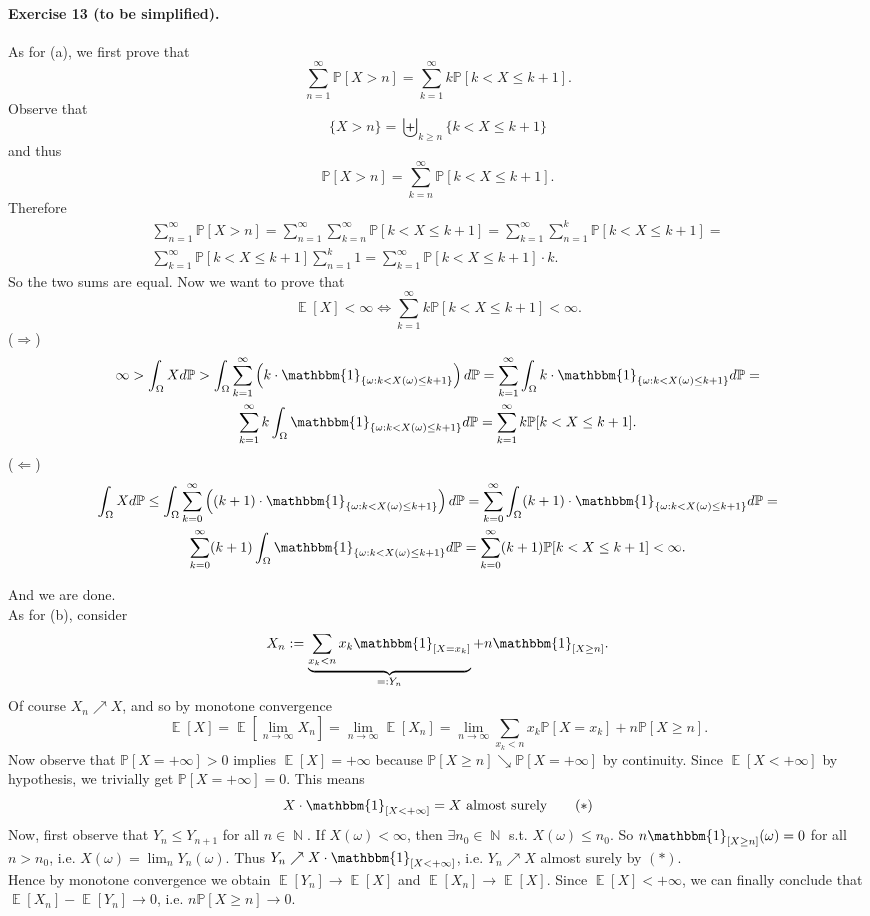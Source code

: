 \documentclass[12pt,a4paper]{report}
\theoremstyle{definition}
\theoremstyle{num.custom-title}
\DeclareMathOperator{\E}{\mathbb{E}}
\DeclareMathOperator{\N}{\mathbb{N}}
\renewcommand{\1}{\mathbbm{1}}
\renewcommand{\P}{\mathbb{P}}
\renewcommand{\iff}{\Leftrightarrow}
\begin{document}
\paragraph{Exercise 13 (to be simplified).}
As for (a), we first prove that
\[
	\sum_{n=1}^\infty \P[X>n] = \sum_{k=1}^\infty k \P[k < X \leq k+1].
\]
Observe that 
\[
\{X>n\}= \biguplus_{k \geq n} \{k < X \leq k+1\}
\]
and thus 
\[
\P[X>n] = \sum_{k=n}^\infty \P[k < X \leq k+1].
\]
Therefore
\begin{multline*}
	\sum_{n=1}^\infty \P[X>n] = \sum_{n=1}^\infty \sum_{k=n}^\infty \P[k < X \leq k+1] = \sum_{k=1}^\infty \sum_{n=1}^k \P[k < X \leq k+1] =\\
	\sum_{k=1}^\infty \P[k < X \leq k+1] \sum_{n=1}^k 1 = \sum_{k=1}^\infty \P[k < X \leq k+1] \cdot k.
\end{multline*}
So the two sums are equal. Now we want to prove that 
\[
\E[X] < \infty \iff \sum_{k=1}^\infty k \P[k < X \leq k+1] < \infty.
\]
($\Longrightarrow$)
\begin{multline*}
	\infty > \int_\Omega X d\P > \int_\Omega \sum_{k=1}^\infty \left( k \cdot \1_{\{\omega : k<X(\omega) \leq k+1\}} \right) d\P= \sum_{k=1}^\infty \int_\Omega k \cdot \1_{\{\omega : k<X(\omega) \leq k+1\}} d\P=\\
	\sum_{k=1}^\infty k \int_\Omega \1_{\{\omega : k<X(\omega) \leq k+1\}} d\P = \sum_{k=1}^\infty k \P[k < X \leq k+1].
\end{multline*}
($\Longleftarrow$)
\begin{multline*}
	\int_\Omega X d\P \leq \int_\Omega \sum_{k=0}^\infty \left( (k+1) \cdot \1_{\{\omega : k<X(\omega) \leq k+1\}} \right) d\P = \sum_{k=0}^\infty \int_\Omega (k+1) \cdot \1_{\{\omega : k<X(\omega) \leq k+1\}} d\P=\\
	\sum_{k=0}^\infty (k+1) \int_\Omega \1_{\{\omega : k<X(\omega) \leq k+1\}} d\P = \sum_{k=0}^\infty (k+1) \P[k < X \leq k+1] < \infty.
\end{multline*}

And we are done.\\
As for (b), consider
\[
X_n := \underbrace{\sum_{x_k < n} x_k \1_{[X=x_k]}}_{=:Y_n} + n \1_{[X \geq n]}.
\]
Of course $X_n \nearrow X$, and so by monotone convergence
\[
\E[X] = \E[\lim_{n \to \infty} X_n] = \lim_{n \to \infty} \E[X_n] = \lim_{n \to \infty} \sum_{x_k < n} x_k \P[X=x_k] + n \P[X \geq n].
\]
Now observe that $\P[X=+\infty]>0$ implies $\E[X]=+\infty$ because $\P[X \geq n] \searrow \P[X=+\infty]$ by continuity. Since $\E[X<+\infty]$ by hypothesis, we trivially get $\P[X=+\infty]=0$. This means
\[
X \cdot \1_{[X<+\infty]} = X \text{ almost surely} \tag{$*$}
\]
Now, first observe that $Y_n \leq Y_{n+1}$ for all $n \in \N$. If $X(\omega) < \infty$, then $\exists n_0 \in \N$ s.t. $X(\omega) \leq n_0$. So $n \1_{[X \geq n]}(\omega)=0$ for all $n > n_0$, i.e. $X(\omega) = \lim_n Y_n(\omega)$. Thus $Y_n \nearrow X \cdot \1_{[X<+\infty]}$, i.e. $Y_n \nearrow X$ almost surely by $(*)$.\\
Hence by monotone convergence we obtain $\E[Y_n] \to \E[X]$ and $\E[X_n] \to \E[X]$. Since $\E[X]<+\infty$, we can finally conclude that $\E[X_n] - \E[Y_n] \to 0$, i.e. $n\P[X \geq n] \to 0$.
\end{document}
